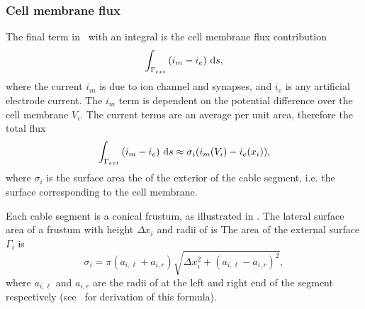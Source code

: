\subsubsection{Cell membrane flux}
The final term in~ with an integral is the cell membrane flux contribution
\begin{equation}
    \int_{\Gamma_{ext}} {(i_m - i_e)} ~\text{d}{s},
\end{equation}
where the current $i_m$ is due to ion channel and synapses, and $i_e$ is any artificial electrode current.
The $i_m$ term is dependent on the potential difference over the cell membrane $V_i$.
The current terms are an average per unit area, therefore the total flux 
\begin{equation}
    \int_{\Gamma_{ext}} {(i_m - i_e)} ~\text{d}{s}
        \approx
    \sigma_i(i_m(V_i) - i_e(x_i)),
        \label{eq:J_im}
\end{equation}
where $\sigma_i$ is the surface area the of the exterior of the cable segment, i.e. the surface corresponding to the cell membrane.

Each cable segment is a conical frustum, as illustrated in .
The lateral surface area of a frustum with height $\Delta x_i$ and radii of  is
The area of the external surface $\Gamma_{i}$ is
\begin{equation}
    \sigma_i = \pi (a_{i,\ell} + a_{i,r}) \sqrt{\Delta x_i^2 + (a_{i,\ell} - a_{i,r})^2},
    \label{eq:cv_volume}
\end{equation}
where $a_{i,\ell}$ and $a_{i,r}$ are the radii of at the left and right end of the segment respectively (see~ for derivation of this formula).
